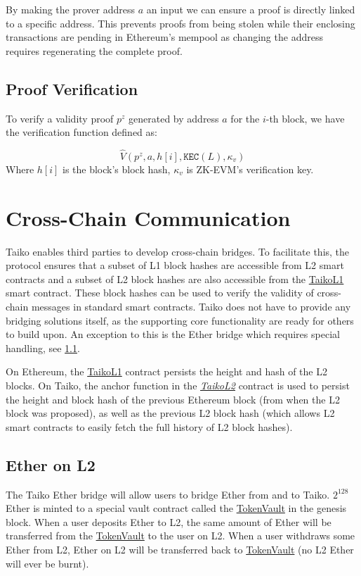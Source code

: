 \documentclass[9pt,oneside]{amsart}
\begin{document}
\begin{multicols}{2}
By making the prover address $a$ an input we can ensure a proof is directly linked to a specific address. This prevents proofs from being stolen while their enclosing transactions are pending in Ethereum's mempool as changing the address requires regenerating the complete proof.

\subsection{Proof Verification} To verify a validity proof $p^z$ generated by address $a$ for the $i$-th block, we have the verification function defined as:

\begin{equation}
    \hat{V}(p^z, a, h[i], \texttt{KEC}(L), \kappa_v)
\end{equation}
Where $h[i]$ is the block's block hash, $\kappa_v$ is  ZK-EVM's verification key.

\section{Cross-Chain Communication}\label{sec:bridges}
Taiko enables third parties to develop cross-chain bridges. To facilitate this, the protocol ensures that a subset of L1 block hashes are accessible from L2 smart contracts and a subset of  L2 block hashes are also accessible from the \underline{TaikoL1} smart contract. These block hashes can be used to verify the validity of cross-chain messages in standard smart contracts. Taiko does not have to provide any bridging solutions itself, as the supporting core functionality are ready for others to build upon. An exception to this is the Ether bridge which requires special handling, see \ref{eth-bridge}. 

On Ethereum, the \underline{TaikoL1} contract persists the height and hash of the L2 blocks. On Taiko, the anchor function in the \emph{\underline{TaikoL2}} contract is used to persist the height and block hash of the previous Ethereum block (from when the L2 block was proposed), as well as the previous L2 block hash (which allows L2 smart contracts to easily fetch the full history of L2 block hashes).

\subsection{Ether on L2}\label{eth-bridge}
The Taiko Ether bridge will allow users to bridge Ether from and to Taiko. $2^{128}$ Ether is minted to a special vault contract called the \underline{TokenVault} in the genesis block. When a user deposits Ether to L2, the same amount of Ether will be transferred from the \underline{TokenVault} to the user on L2. When a user withdraws some Ether from L2, Ether on L2 will be transferred back to \underline{TokenVault} (no L2 Ether will ever be burnt).


\end{multicols}
\end{document}
